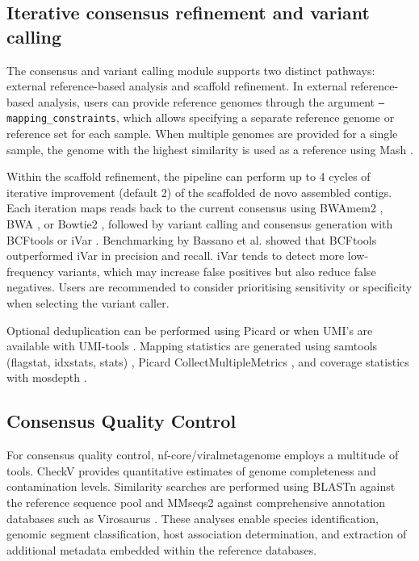 \subsection{Iterative consensus refinement and variant calling}

The consensus and variant calling module supports two distinct pathways: external reference-based analysis and scaffold refinement. In external reference-based analysis, users can provide reference genomes through the argument \texttt{--mapping\_constraints}, which allows specifying a separate reference genome or reference set for each sample. When multiple genomes are provided for a single sample, the genome with the highest similarity is used as a reference using Mash \cite{Ondov2019-bo}.

Within the scaffold refinement, the pipeline can perform up to 4 cycles of iterative improvement (default 2) of the scaffolded de novo assembled contigs. Each iteration maps reads back to the current consensus using BWAmem2 \cite{Vasimuddin2019-rb}, BWA \cite{Li2013-pp}, or Bowtie2 \cite{Langmead2019-wx}, followed by variant calling and consensus generation with BCFtools \cite{Danecek2021-je} or iVar \cite{Grubaugh2019-xd}. Benchmarking by Bassano et al. \cite{Bassano2022-cl} showed that BCFtools outperformed iVar in precision and recall. iVar tends to detect more low-frequency variants, which may increase false positives but also reduce false negatives. Users are recommended to consider prioritising sensitivity or specificity when selecting the variant caller.

Optional deduplication can be performed using Picard or when UMI’s are available with UMI-tools \cite{Smith2017-nk}. Mapping statistics are generated using samtools (flagstat, idxstats, stats) \cite{Danecek2021-je}, Picard CollectMultipleMetrics \cite{Broad-Institute2019-rv}, and coverage statistics with mosdepth \cite{Pedersen2018-mu}.

\subsection{Consensus Quality Control}

For consensus quality control, nf-core/viralmetagenome employs a multitude of tools. CheckV \cite{Nayfach2021-wl} provides quantitative estimates of genome completeness and contamination levels. Similarity searches are performed using BLASTn \cite{Altschul1990-sy} against the reference sequence pool and MMseqs2 \cite{Steinegger2017-ci} against comprehensive annotation databases such as Virosaurus \cite{Gleizes2020-rq}. These analyses enable species identification, genomic segment classification, host association determination, and extraction of additional metadata embedded within the reference databases.


